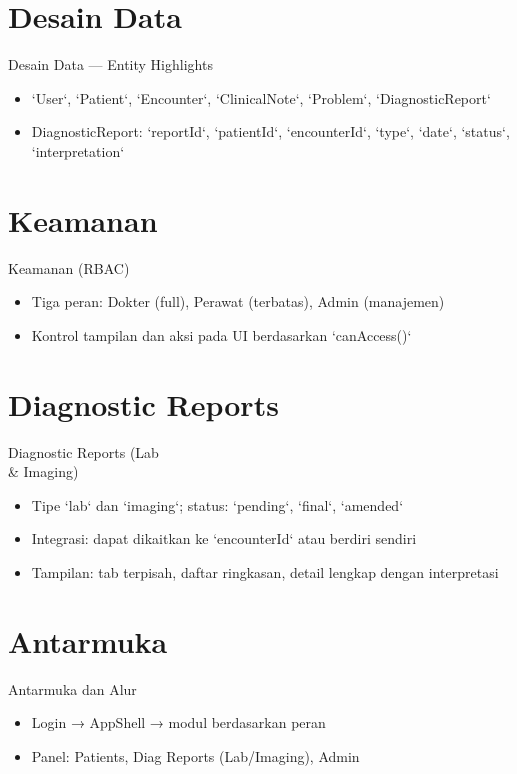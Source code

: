 \documentclass{beamer}
\begin{document}
\section{Desain Data}
\begin{frame}{Desain Data — Entity Highlights}
  \begin{itemize}
    \item `User`, `Patient`, `Encounter`, `ClinicalNote`, `Problem`, `DiagnosticReport`
    \item DiagnosticReport: `reportId`, `patientId`, `encounterId`, `type`, `date`, `status`, `interpretation`
  \end{itemize}
\end{frame}

\section{Keamanan}
\begin{frame}{Keamanan (RBAC)}
  \begin{itemize}
    \item Tiga peran: Dokter (full), Perawat (terbatas), Admin (manajemen)
    \item Kontrol tampilan dan aksi pada UI berdasarkan `canAccess()`
  \end{itemize}
\end{frame}

\section{Diagnostic Reports}
\begin{frame}{Diagnostic Reports (Lab \\ \& Imaging)}
  \begin{itemize}
    \item Tipe `lab` dan `imaging`; status: `pending`, `final`, `amended`
    \item Integrasi: dapat dikaitkan ke `encounterId` atau berdiri sendiri
    \item Tampilan: tab terpisah, daftar ringkasan, detail lengkap dengan interpretasi
  \end{itemize}
\end{frame}

\section{Antarmuka}
\begin{frame}{Antarmuka dan Alur}
  \begin{itemize}
    \item Login → AppShell → modul berdasarkan peran
    \item Panel: Patients, Diag Reports (Lab/Imaging), Admin
  \end{itemize}
\end{frame}
\end{document}
